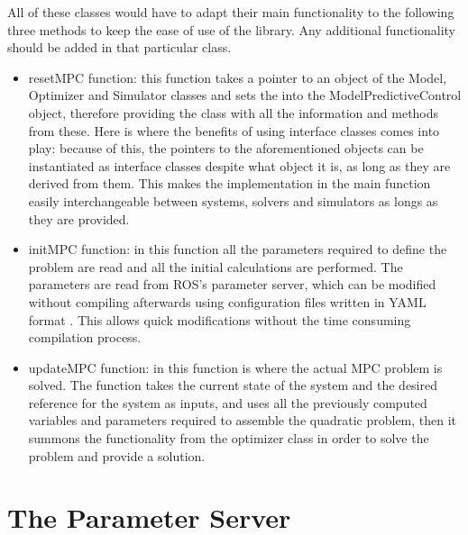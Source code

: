 All of these classes would have to adapt their main functionality to the following three methods to keep the ease of use of the library. Any additional functionality should be added in that particular class.

\begin{itemize}


\item resetMPC function: this function takes a pointer to an object of the Model, Optimizer and Simulator classes and sets the into the ModelPredictiveControl object, therefore providing the class with all the information and methods from these. Here is where the benefits of using interface classes comes into play: because of this, the pointers to the aforementioned objects can be instantiated as interface classes despite what object it is, as long as they are derived from them. This makes the implementation in the main function easily interchangeable between systems, solvers and simulators as longs as they are provided.

\item initMPC function: in this function all the parameters required to define the problem are read and all the initial calculations are performed. The parameters are read from ROS's parameter server, which can be modified without compiling afterwards using configuration files written in YAML format \cite{ClarkEvans2004}. This allows quick modifications without the time consuming compilation process.

\item updateMPC function: in this function is where the actual MPC problem is solved. The function takes the current state of the system and the desired reference for the system as inputs, and uses all the previously computed variables and parameters required to assemble the quadratic problem, then it summons the functionality from the optimizer class in order to solve the problem and provide a solution.   

\end{itemize}

\section{The Parameter Server}



